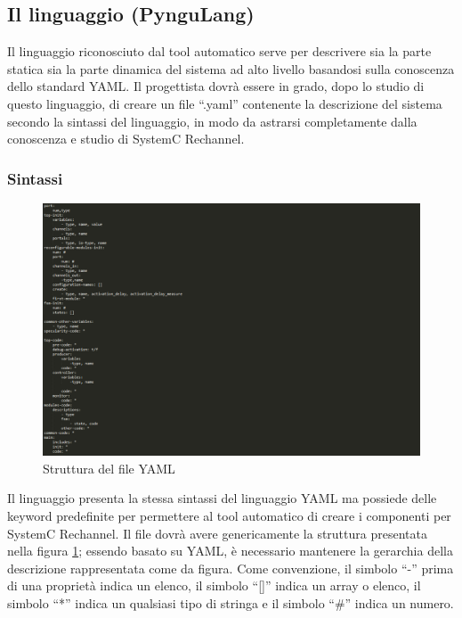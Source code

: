 \documentclass[a4paper,titlepage]{book}
\begin{document}
\subsection{Il linguaggio (PynguLang)}

Il linguaggio riconosciuto dal tool automatico serve per descrivere sia la parte statica sia la parte dinamica del sistema ad alto livello basandosi sulla conoscenza dello standard YAML. Il progettista dovrà essere in grado, dopo lo studio di questo linguaggio, di creare un file ``.yaml'' contenente la descrizione del sistema secondo la sintassi del linguaggio, in modo da astrarsi completamente dalla conoscenza e studio di SystemC Rechannel.

\subsubsection{Sintassi}

\begin{figure}[!ht]
\centering
\includegraphics[scale=0.45]{strutturayaml.png}
\caption{Struttura del file YAML}\label{fig:yamlfile}
\end{figure}

Il linguaggio presenta la stessa sintassi del linguaggio YAML ma possiede delle keyword predefinite per permettere al tool automatico di creare i componenti per SystemC Rechannel. Il file dovrà avere genericamente la struttura presentata nella figura \ref{fig:yamlfile}; essendo basato su YAML, è necessario mantenere la gerarchia della descrizione rappresentata come da figura. Come convenzione, il simbolo ``-'' prima di una proprietà indica un elenco, il simbolo ``[]'' indica un array o elenco, il simbolo ``*'' indica un qualsiasi tipo di stringa e il simbolo ``\#'' indica un numero.
\end{document}
